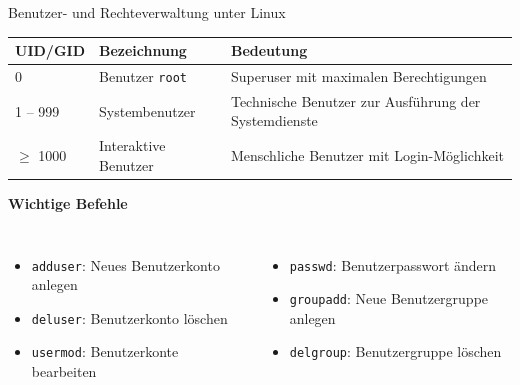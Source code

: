 {\begin{frame}[allowframebreaks]{Benutzer- und Rechteverwaltung unter Linux}
{        \begin{tabularx}{\textwidth}{p{} p{} X}
            \hline
            \textbf{UID/GID} & \textbf{Bezeichnung} & \textbf{Bedeutung} \\
            \hline

            0 & Benutzer \texttt{root} & Superuser mit maximalen Berechtigungen \\
            1 -- 999 & Systembenutzer & Technische Benutzer zur Ausführung der Systemdienste \\
            $\geq$ 1000 & Interaktive Benutzer & Menschliche Benutzer mit Login-Möglichkeit \\
            \hline
        \end{tabularx}
    }

    \medskip
    \textbf{Wichtige Befehle}
    {
        \setlength{\leftmargini}{1.2em}
        \begin{columns}[T, onlytextwidth]
            \begin{itemize}
                \item \texttt{adduser}: Neues Benutzerkonto anlegen
                \item \texttt{deluser}: Benutzerkonto löschen
                \item \texttt{usermod}: Benutzerkonte bearbeiten
            \end{itemize}

            \begin{itemize}
                \item \texttt{passwd}: Benutzerpasswort ändern
                \item \texttt{groupadd}: Neue Benutzergruppe anlegen
                \item \texttt{delgroup}: Benutzergruppe löschen
            \end{itemize}
        \end{columns}
    }
\end{frame}
}






